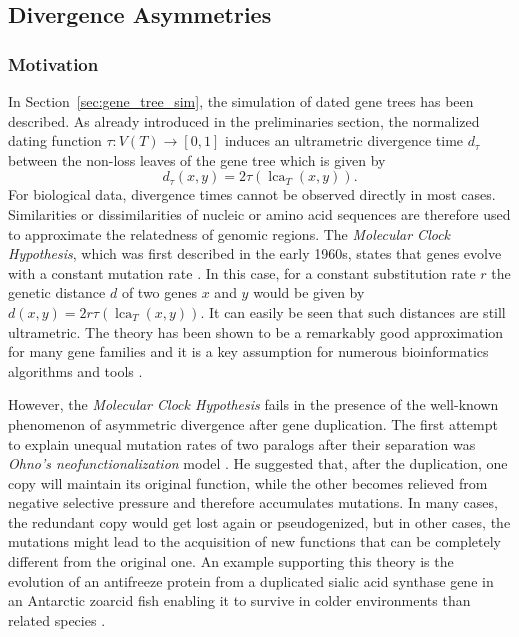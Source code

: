 \documentclass[hidelinks,11pt]{scrreprt}
\DeclareMathOperator{\lca}{lca}
\begin{document}
\newpage


\subsection{Divergence Asymmetries}
\label{sec:divergence_asym}

\subsubsection{Motivation}

In Section~\ref{sec:gene_tree_sim}, the simulation of dated gene trees has been described. As already introduced in the preliminaries section, the normalized dating function $\tau: V(T) \rightarrow [0,1]$ induces an ultrametric divergence time $d_\tau$ between the non-loss leaves of the gene tree which is given by
\begin{equation}
d_\tau(x,y) = 2 \tau(\lca_T(x,y)).
\end{equation}
For biological data, divergence times cannot be observed directly in most cases. Similarities or dissimilarities of nucleic or amino acid sequences are therefore used to approximate the relatedness of genomic regions.
The \emph{Molecular Clock Hypothesis}, which was first described in the early 1960s, states that genes evolve with a constant mutation rate \citep{zuckerkandl1962}. In this case, for a constant substitution rate $r$ the genetic distance $d$ of two genes $x$ and $y$ would be given by $d(x,y) = 2 r \tau(\lca_T(x,y))$. It can easily be seen that such distances are still ultrametric.
The theory has been shown to be a remarkably good approximation for many gene families and it is a key assumption for numerous bioinformatics algorithms and tools \citep[e.g.][]{bromham2003,kumar2005}.

However, the \emph{Molecular Clock Hypothesis} fails in the presence of the well-known phenomenon of asymmetric divergence after gene duplication.
The first attempt to explain unequal mutation rates of two paralogs after their separation was \emph{Ohno's neofunctionalization} model \citep{ohno1970}. He suggested that, after the duplication, one copy will maintain its original function, while the other becomes relieved from negative selective pressure and therefore accumulates mutations. In many cases, the redundant copy would get lost again or pseudogenized, but in other cases, the mutations might lead to the acquisition of new functions that can be completely different from the original one. An example supporting this theory is the evolution of an antifreeze protein from a duplicated sialic acid synthase gene in an Antarctic zoarcid fish enabling it to survive in colder environments than related species \citep{deng_evolution_2010}.
\end{document}
